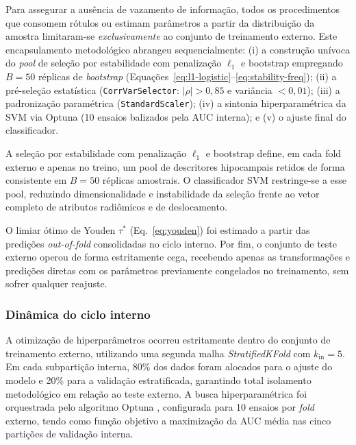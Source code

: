 \documentclass[review]{elsarticle}
\newcommand{\code}[1]{\texttt{#1}}
\begin{document}
	Para assegurar a ausência de vazamento de informação, todos os procedimentos que consomem rótulos ou estimam parâmetros a partir da distribuição da amostra limitaram-se \emph{exclusivamente} ao conjunto de treinamento externo. Este encapsulamento metodológico abrangeu sequencialmente: (i) a construção unívoca do \emph{pool} de seleção por estabilidade com penalização $\ell_1$ e bootstrap empregando $B=50$ réplicas de \emph{bootstrap} (Equações~\eqref{eq:l1-logistic}--\eqref{eq:stability-freq}); (ii) a pré-seleção estatística (\code{CorrVarSelector}: $|\rho|>0{,}85$ e variância $<0{,}01$); (iii) a padronização paramétrica (\code{StandardScaler}); (iv) a sintonia hiperparamétrica da SVM via Optuna (10 ensaios balizados pela AUC interna); e (v) o ajuste final do classificador.
	
	A seleção por estabilidade com penalização $\ell_1$ e bootstrap define, em cada fold externo e apenas no treino, um pool de descritores hipocampais retidos de forma consistente em $B=50$ réplicas amostrais. O classificador SVM restringe-se a esse pool, reduzindo dimensionalidade e instabilidade da seleção frente ao vetor completo de atributos radiômicos e de deslocamento.
	
	O limiar ótimo de Youden $\tau^*$ (Eq.~\ref{eq:youden}) foi estimado a partir das predições \emph{out-of-fold} consolidadas no ciclo interno. Por fim, o conjunto de teste externo operou de forma estritamente cega, recebendo apenas as transformações e predições diretas com os parâmetros previamente congelados no treinamento, sem sofrer qualquer reajuste.
	
	\subsubsection{Dinâmica do ciclo interno}
	A otimização de hiperparâmetros ocorreu estritamente dentro do conjunto de treinamento externo, utilizando uma segunda malha \emph{StratifiedKFold} com $k_{\mathrm{in}}=5$. Em cada subpartição interna, 80\% dos dados foram alocados para o ajuste do modelo e 20\% para a validação estratificada, garantindo total isolamento metodológico em relação ao teste externo. A busca hiperparamétrica foi orquestrada pelo algoritmo Optuna \citep{akiba-2019}, configurada para 10 ensaios por \emph{fold} externo, tendo como função objetivo a maximização da AUC média nas cinco partições de validação interna. 
	
\end{document}
